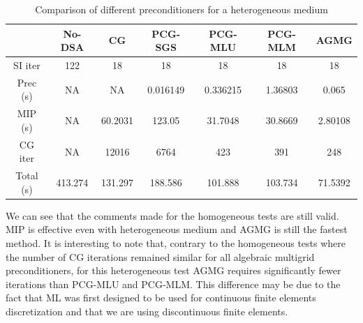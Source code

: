 \begin{table}[H]
  \begin{center}
    \caption{Comparison of different preconditioners for a heterogeneous medium}
    \begin{tabular}{|c|c|c|c|c|c|c|}
      \hline
      & No-DSA & CG & PCG-SGS & PCG-MLU & PCG-MLM & AGMG\\
      \hline
      SI iter   & 122      & 18      & 18       & 18       & 18      & 18 \\
      Prec (s)  & NA       & NA      & 0.016149 & 0.336215 & 1.36803 & 0.065 \\
      MIP (s)   & NA       & 60.2031 & 123.05   & 31.7048  & 30.8669 & 2.80108\\
      CG iter   & NA       & 12016   & 6764     & 423      & 391     & 248 \\
      Total (s) & 413.274  & 131.297 & 188.586  & 101.888  & 103.734 & 71.5392\\
      \hline
    \end{tabular}
    \label{tab_4}
  \end{center}
\end{table}
We can see that the comments made for the homogeneous tests are
still valid. MIP is effective even with heterogeneous medium and AGMG is
still the fastest method. It is interesting to note that, contrary to 
  the homogeneous tests where the number of CG iterations remained similar for all 
  algebraic multigrid preconditioners, for this heterogeneous test AGMG requires
  significantly fewer iterations than PCG-MLU and PCG-MLM. This difference may
  be due to the fact that ML was first designed to be used for
  continuous finite elements discretization and that we are using
discontinuous finite elements.

